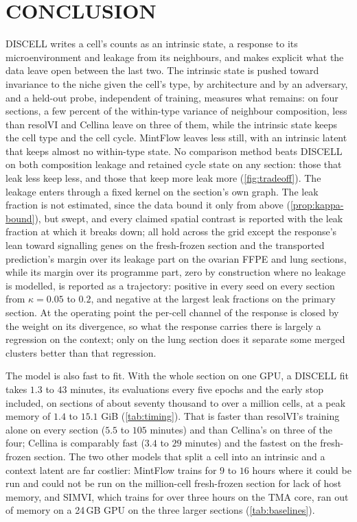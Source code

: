 \section{CONCLUSION}
\label{sec:conclusion}

DISCELL writes a cell's counts as an intrinsic state, a response to its microenvironment and leakage from its neighbours, and makes explicit what the data leave open between the last two. The intrinsic state is pushed toward invariance to the niche given the cell's type, by architecture and by an adversary, and a held-out probe, independent of training, measures what remains: on four sections, a few percent of the within-type variance of neighbour composition, less than resolVI and Cellina leave on three of them, while the intrinsic state keeps the cell type and the cell cycle. MintFlow leaves less still, with an intrinsic latent that keeps almost no within-type state. No comparison method beats DISCELL on both composition leakage and retained cycle state on any section: those that leak less keep less, and those that keep more leak more (\cref{fig:tradeoff}). The leakage enters through a fixed kernel on the section's own graph. The leak fraction is not estimated, since the data bound it only from above (\cref{prop:kappa-bound}), but swept, and every claimed spatial contrast is reported with the leak fraction at which it breaks down; all hold across the grid except the response's lean toward signalling genes on the fresh-frozen section and the transported prediction's margin over its leakage part on the ovarian FFPE and lung sections, while its margin over its programme part, zero by construction where no leakage is modelled, is reported as a trajectory: positive in every seed on every section from $\kappa = 0.05$ to $0.2$, and negative at the largest leak fractions on the primary section. At the operating point the per-cell channel of the response is closed by the weight on its divergence, so what the response carries there is largely a regression on the context; only on the lung section does it separate some merged clusters better than that regression.

The model is also fast to fit. With the whole section on one GPU, a DISCELL fit takes $1.3$ to $43$ minutes, its evaluations every five epochs and the early stop included, on sections of about seventy thousand to over a million cells, at a peak memory of $1.4$ to $15.1$ GiB (\cref{tab:timing}). That is faster than resolVI's training alone on every section ($5.5$ to $105$ minutes) and than Cellina's on three of the four; Cellina is comparably fast ($3.4$ to $29$ minutes) and the fastest on the fresh-frozen section. The two other models that split a cell into an intrinsic and a context latent are far costlier: MintFlow trains for $9$ to $16$ hours where it could be run and could not be run on the million-cell fresh-frozen section for lack of host memory, and SIMVI, which trains for over three hours on the TMA core, ran out of memory on a 24\,GB GPU on the three larger sections (\cref{tab:baselines}).

